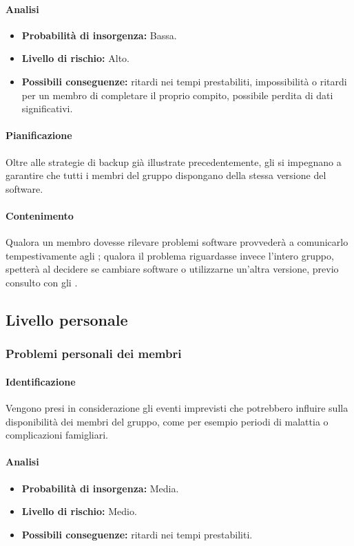 \paragraph {Analisi}
\begin{itemize}
	\item \textbf{Probabilità di insorgenza:} Bassa.
	\item \textbf{Livello di rischio:} Alto.
	\item \textbf{Possibili conseguenze:} ritardi nei tempi prestabiliti, impossibilità o ritardi per un membro di completare il proprio compito, possibile perdita di dati significativi.
\end{itemize}

\paragraph {Pianificazione}
Oltre alle strategie di backup già illustrate precedentemente, gli \adms{} si impegnano a garantire che tutti i membri del gruppo dispongano della stessa versione del software.

\paragraph {Contenimento}
Qualora un membro dovesse rilevare problemi software provvederà a comunicarlo tempestivamente agli \adms{}; qualora il problema riguardasse invece l'intero gruppo, spetterà al \RdP{} decidere se cambiare software o utilizzarne un'altra versione, previo consulto con gli \adms{}.

\subsection{Livello personale}
\subsubsection{Problemi personali dei membri}
\paragraph {Identificazione}
Vengono presi in considerazione gli eventi imprevisti che potrebbero influire sulla disponibilità dei membri del gruppo, come per esempio periodi di malattia o complicazioni famigliari.

\paragraph {Analisi}
\begin{itemize}
	\item \textbf{Probabilità di insorgenza:} Media.
	\item \textbf{Livello di rischio:} Medio.
	\item \textbf{Possibili conseguenze:} ritardi nei tempi prestabiliti.
\end{itemize}

